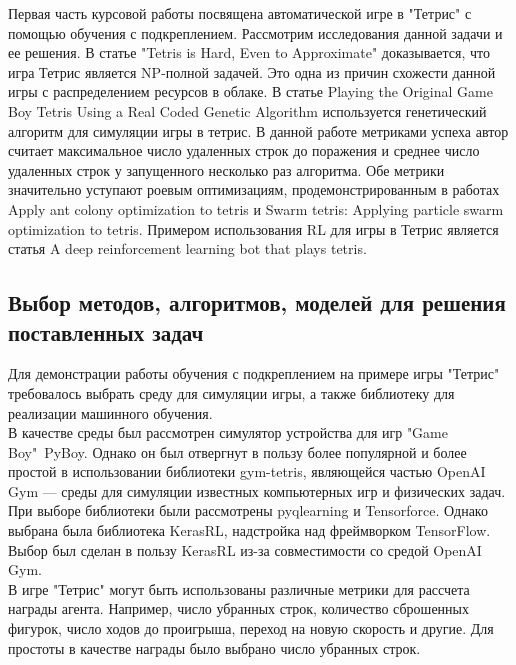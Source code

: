 \documentclass{article}
\begin{document}
Первая часть курсовой работы посвящена автоматической игре в "Тетрис" с помощью обучения с подкреплением. Рассмотрим исследования данной задачи и ее решения. В статье "Tetris is Hard, Even to Approximate"\cite{litlink6} доказывается, что игра Тетрис является NP-полной задачей. Это одна из причин схожести данной игры с распределением ресурсов в облаке\cite{litlink6}. В статье Playing the Original Game Boy Tetris Using a Real Coded Genetic Algorithm\cite{litlink7} используется генетический алгоритм для симуляции игры в тетрис. В данной работе метриками успеха автор считает максимальное число удаленных строк до поражения и среднее число удаленных строк у запущенного несколько раз алгоритма. Обе метрики значительно уступают роевым оптимизациям,  продемонстрированным в работах Apply ant colony optimization to tetris\cite{litlink19} и Swarm tetris: Applying particle swarm optimization to tetris\cite{litlink10}. Примером использования RL для игры в Тетрис является статья A deep reinforcement learning bot that plays tetris\cite{litlink13}.
\newpage
\begin{center}
\section {Выбор методов, алгоритмов, моделей для решения поставленных задач}
\end{center}
Для демонстрации работы обучения с подкреплением на примере игры "Тетрис" требовалось выбрать среду для симуляции игры, а также библиотеку для реализации машинного обучения.\\
В качестве среды был рассмотрен симулятор устройства для игр "Game Boy"\ PyBoy\cite{litlink3}. Однако он был отвергнут в пользу более популярной и более простой в использовании библиотеки gym-tetris\cite{litlink5}, являющейся частью OpenAI Gym\cite{litlink14} — среды для симуляции известных компьютерных игр и физических задач.\\
При выборе библиотеки были рассмотрены pyqlearning\cite{litlink1} и Tensorforce\cite{litlink17}. Однако выбрана была библиотека KerasRL\cite{litlink9}, надстройка над фреймворком TensorFlow\cite{litlink16}. Выбор был сделан в пользу KerasRL из-за совместимости со средой OpenAI Gym.\\
В игре "Тетрис" могут быть использованы различные метрики для рассчета награды агента. Например, число убранных строк, количество сброшенных фигурок, число ходов до проигрыша, переход на новую скорость и другие. Для простоты в качестве награды было выбрано число убранных строк.\\
\end{document}
